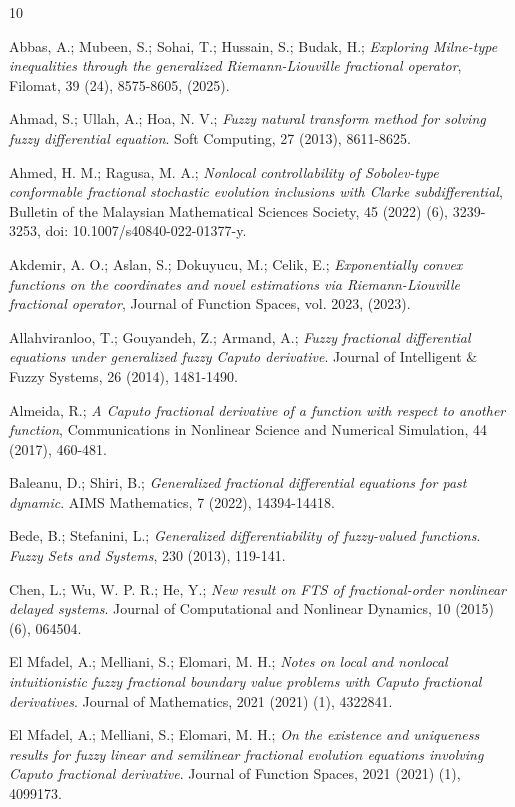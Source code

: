 \documentclass[reqno]{amsart}
\begin{document}
\begin{thebibliography}{10}

  Abbas, A.; Mubeen, S.; Sohai, T.; Hussain, S.; Budak, H.;
\emph{Exploring Milne-type inequalities through the generalized Riemann-Liouville 
fractional operator}, Filomat, 39 (24), 8575-8605, (2025).
 
Ahmad, S.; Ullah, A.; Hoa, N. V.;
\emph{Fuzzy natural transform method for solving fuzzy differential equation}.
Soft Computing, 27 (2013), 8611-8625.

 Ahmed, H. M.; Ragusa, M. A.;
\emph{Nonlocal controllability of Sobolev-type conformable fractional stochastic 
evolution inclusions with Clarke subdifferential}, 
Bulletin of the Malaysian Mathematical Sciences Society, 45 (2022) (6), 3239-3253, 
doi: 10.1007/s40840-022-01377-y.

 Akdemir, A. O.; Aslan, S.; Dokuyucu, M.; Celik, E.;
\emph{Exponentially convex functions on the coordinates and novel estimations via
 Riemann-Liouville fractional operator}, Journal of Function Spaces, vol. 2023, (2023).


Allahviranloo, T.; Gouyandeh, Z.; Armand, A.;
\emph{Fuzzy fractional differential equations under generalized fuzzy Caputo derivative}.
Journal of Intelligent \& Fuzzy Systems, 26  (2014), 1481-1490.

Almeida, R.;
\emph{A Caputo fractional derivative of a function with respect to another
function}, Communications in Nonlinear Science and Numerical Simulation, 44 (2017),
 460-481.
 
Baleanu, D.; Shiri, B.;
\emph{Generalized fractional differential equations for past dynamic}.
AIMS Mathematics, 7 (2022), 14394-14418.

Bede, B.; Stefanini, L.;
\emph{Generalized differentiability of fuzzy-valued functions}. 
\emph{Fuzzy Sets and Systems}, 230 (2013), 119-141.

Chen, L.; Wu, W. P. R.;  He, Y.;
\emph{New result on FTS of fractional-order nonlinear delayed systems}. 
Journal of Computational and Nonlinear Dynamics, 10 (2015) (6), 064504.

 El Mfadel, A.; Melliani, S.; Elomari, M. H.;
\emph{Notes on local and nonlocal intuitionistic fuzzy fractional boundary
value problems with Caputo fractional derivatives}.
Journal of Mathematics, 2021 (2021) (1), 4322841.

 El Mfadel, A.; Melliani, S.; Elomari, M. H.;
\emph{On the existence and uniqueness results for fuzzy linear and semilinear
fractional evolution equations involving Caputo fractional derivative}.
Journal of Function Spaces, 2021 (2021) (1), 4099173.


\end{thebibliography}
\end{document}
